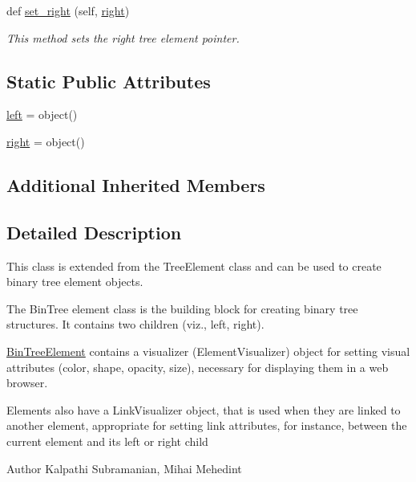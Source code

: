 \begin{DoxyCompactItemize}
def \mbox{\hyperlink{classbridges_1_1bin__tree__element_1_1_bin_tree_element_a9ffd3555d1ffcbd6692c3da53fad35d7}{set\+\_\+right}} (self, \mbox{\hyperlink{classbridges_1_1bin__tree__element_1_1_bin_tree_element_a6cf0c7fefefd5eada106df191e055ff5}{right}})
\begin{DoxyCompactList}\small\item\em This method sets the right tree element pointer. \end{DoxyCompactList}\end{DoxyCompactItemize}
\subsection*{Static Public Attributes}
\begin{DoxyCompactItemize}
\item 
\mbox{\hyperlink{classbridges_1_1bin__tree__element_1_1_bin_tree_element_a1e475410000759a092959455957894b6}{left}} = object()
\item 
\mbox{\hyperlink{classbridges_1_1bin__tree__element_1_1_bin_tree_element_a6cf0c7fefefd5eada106df191e055ff5}{right}} = object()
\end{DoxyCompactItemize}
\subsection*{Additional Inherited Members}


\subsection{Detailed Description}
This class is extended from the Tree\+Element class and can be used to create binary tree element objects. 

The Bin\+Tree element class is the building block for creating binary tree structures. It contains two children (viz., left, right).

\mbox{\hyperlink{classbridges_1_1bin__tree__element_1_1_bin_tree_element}{Bin\+Tree\+Element}} contains a visualizer (Element\+Visualizer) object for setting visual attributes (color, shape, opacity, size), necessary for displaying them in a web browser.

Elements also have a Link\+Visualizer object, that is used when they are linked to another element, appropriate for setting link attributes, for instance, between the current element and its left or right child

\begin{DoxyAuthor}{Author}
Kalpathi Subramanian, Mihai Mehedint 
\end{DoxyAuthor}


